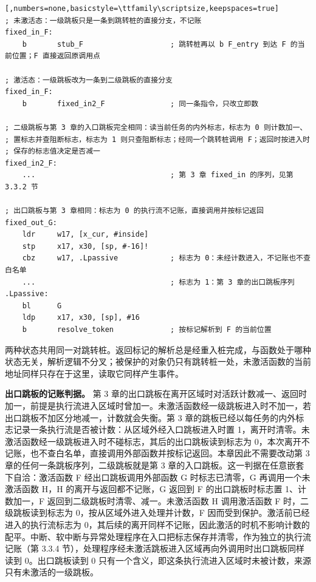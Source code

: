 \noindent\begin{minipage}{\linewidth}
\begin{lstlisting}[,numbers=none,basicstyle=\ttfamily\scriptsize,keepspaces=true]
; 未激活态：一级跳板只是一条到跳转桩的直接分支，不记账
fixed_in_F:
    b       stub_F                    ; 跳转桩再以 b F_entry 到达 F 的当前位置；F 直接返回原调用点

; 激活态：一级跳板改为一条到二级跳板的直接分支
fixed_in_F:
    b       fixed_in2_F               ; 同一条指令，只改立即数

; 二级跳板与第 3 章的入口跳板完全相同：读当前任务的内外标志，标志为 0 则计数加一、
; 置标志并查阻断标志，标志为 1 则只查阻断标志；经同一个跳转桩调用 F；返回时按进入时
; 保存的标志值决定是否减一
fixed_in2_F:
    ...                               ; 第 3 章 fixed_in 的序列，见第 3.3.2 节

; 出口跳板与第 3 章相同：标志为 0 的执行流不记账，直接调用并按标记返回
fixed_out_G:
    ldr     w17, [x_cur, #inside]
    stp     x17, x30, [sp, #-16]!
    cbz     w17, .Lpassive            ; 标志为 0：未经计数进入，不记账也不查白名单
    ...                               ; 标志为 1：第 3 章的出口跳板序列
.Lpassive:
    bl      G
    ldp     x17, x30, [sp], #16
    b       resolve_token             ; 按标记解析到 F 的当前位置
\end{lstlisting}
\end{minipage}

两种状态共用同一对跳转桩。返回标记的解析总是经重入桩完成，与函数处于哪种状态无关，解析逻辑不分叉；被保护的对象仍只有跳转桩一处，未激活函数的当前地址同样只存在于这里，读取它同样产生事件。

\textbf{出口跳板的记账判据。} 第 3 章的出口跳板在离开区域时对活跃计数减一、返回时加一，前提是执行流进入区域时曾加一。未激活函数经一级跳板进入时不加一，若出口跳板不加区分地减一，计数就会失衡。第 3 章的跳板已经以每任务的内外标志记录一条执行流是否被计数：从区域外经入口跳板进入时置 1，离开时清零。未激活函数经一级跳板进入时不碰标志，其后的出口跳板读到标志为 0，本次离开不记账，也不查白名单，直接调用外部函数并按标记返回。本章因此不需要改动第 3 章的任何一条跳板序列，二级跳板就是第 3 章的入口跳板。这一判据在任意嵌套下自洽：激活函数 F 经出口跳板调用外部函数 G 时标志已清零，G 再调用一个未激活函数 H，H 的离开与返回都不记账，G 返回到 F 的出口跳板时标志置 1、计数加一，F 返回到二级跳板时清零、减一。未激活函数 H 调用激活函数 F 时，二级跳板读到标志为 0，按从区域外进入处理并计数，F 因而受到保护。激活前已经进入的执行流标志为 0，其后续的离开同样不记账，因此激活的时机不影响计数的配平。中断、软中断与异常处理程序在入口把标志保存并清零，作为独立的执行流记账（第 3.3.4 节），处理程序经未激活跳板进入区域再向外调用时出口跳板同样读到 0。出口跳板读到 0 只有一个含义，即这条执行流进入区域时未被计数，来源只有未激活的一级跳板。

